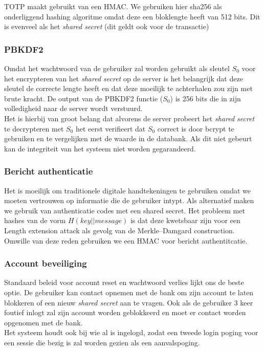 \documentclass[11pt]{article}
\begin{document}
TOTP maakt gebruikt van een HMAC. We gebruiken hier sha256 als onderliggend hashing algoritme omdat deze een bloklengte heeft van 512 bits. Dit is evenveel als het \emph{shared secret} (dit geldt ook voor de transactie)
\subsubsection{PBKDF2}
\label{sec:pbkdf2}
Omdat het wachtwoord van de gebruiker zal worden gebruikt als sleutel $S_{0}$ voor het encrypteren van het \emph{shared secret} op de server is het belangrijk dat deze sleutel de correcte lengte heeft en dat deze moeilijk te achterhalen zou zijn met brute kracht. De output van de PBKDF2 functie ($S_{0}$) is 256 bits die in zijn volledigheid naar de server wordt verstuurd.\\

Het is hierbij van groot belang dat alvorens de server probeert het \emph{shared secret} te decrypteren met $S_{0}$ het eerst verifieert dat $S_{0}$ correct is door bcrypt te gebruiken en te vergelijken met de waarde in de databank. Als dit niet gebeurt kan de integriteit van het systeem niet worden gegarandeerd. 
\subsubsection{Bericht authenticatie}
\label{sec:mac}
Het is moeilijk om traditionele digitale handtekeningen te gebruiken omdat we moeten vertrouwen op informatie die de gebruiker intypt. Als alternatief maken we gebruik van authenticatie codes met een shared secret. Het probleem met hashes van de vorm $H(key || message)$ is dat deze kwetsbaar zijn voor een Length extension attack als gevolg van de Merkle–Damgard construction\cite{len_ext_attack}. Omwille van deze reden gebruiken we een HMAC voor bericht authentitcatie.
\subsubsection{Account beveiliging}
\label{sec:bev}
Standaard beleid voor account reset en wachtwoord verlies lijkt ons de beste optie. De gebruiker kan contact opnemen met de bank om zijn account te laten blokkeren of een nieuw \emph{shared secret} aan te vragen. Ook als de gebruiker 3 keer foutief inlogt zal zijn account worden geblokkeerd en moet er contact worden opgenomen met de bank.\\

Het systeem houdt ook bij wie al is ingelogd, zodat een tweede login poging voor een sessie die bezig is zal worden gezien als een aanvalspoging.
\end{document}
